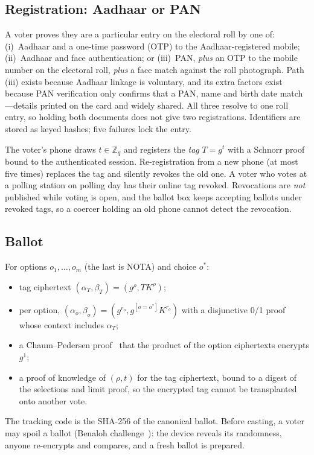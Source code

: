 \documentclass[runningheads]{llncs}
\newcommand{\Zq}{\mathbb{Z}_q}
\begin{document}
\subsection{Registration: Aadhaar or PAN}
A voter proves they are a particular entry on the electoral roll by one of: (i)~Aadhaar and a one-time password (OTP) to the Aadhaar-registered mobile; (ii)~Aadhaar and face authentication; or (iii)~PAN, \emph{plus} an OTP to the mobile number on the electoral roll, \emph{plus} a face match against the roll photograph. Path (iii) exists because Aadhaar linkage is voluntary, and its extra factors exist because PAN verification only confirms that a PAN, name and birth date match---details printed on the card and widely shared. All three resolve to one roll entry, so holding both documents does not give two registrations. Identifiers are stored as keyed hashes; five failures lock the entry.

The voter's phone draws $t \in \Zq$ and registers the \emph{tag} $T = g^t$ with a Schnorr proof bound to the authenticated session. Re-registration from a new phone (at most five times) replaces the tag and silently revokes the old one. A voter who votes at a polling station on polling day has their online tag revoked. Revocations are \emph{not} published while voting is open, and the ballot box keeps accepting ballots under revoked tags, so a coercer holding an old phone cannot detect the revocation.

\subsection{Ballot}
For options $o_1,\dots,o_m$ (the last is NOTA) and choice $o^\ast$:
\begin{itemize}
\item tag ciphertext $(\alpha_T,\beta_T) = (g^\rho, T K^\rho)$;
\item per option, $(\alpha_o,\beta_o) = (g^{r_o}, g^{[o=o^\ast]}K^{r_o})$ with a disjunctive 0/1 proof~\cite{cds1994} whose context includes $\alpha_T$;
\item a Chaum--Pedersen proof~\cite{chaumpedersen1992} that the product of the option ciphertexts encrypts $g^1$;
\item a proof of knowledge of $(\rho, t)$ for the tag ciphertext, bound to a digest of the selections and limit proof, so the encrypted tag cannot be transplanted onto another vote.
\end{itemize}
The tracking code is the SHA-256 of the canonical ballot. Before casting, a voter may spoil a ballot (Benaloh challenge~\cite{benaloh2007}): the device reveals its randomness, anyone re-encrypts and compares, and a fresh ballot is prepared.
\end{document}
